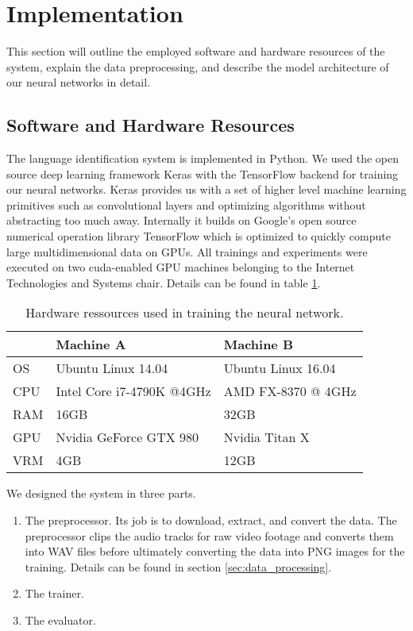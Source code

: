 \section{Implementation}
This section will outline the employed software and hardware resources of the system, explain the data preprocessing, and describe the model architecture of our neural networks in detail.

\subsection{Software and Hardware Resources}

	The language identification system is implemented in Python. We used the open source deep learning framework Keras\cite{chollet2015keras} with the TensorFlow\cite{abadi2016tensorflow} backend for training our neural networks. Keras provides us with a set of higher level machine learning primitives such as convolutional layers and optimizing algorithms without abstracting too much away. Internally it builds on Google's open source numerical operation library TensorFlow which is optimized to quickly compute large multidimensional data on GPUs.
		All trainings and experiments were executed on two cuda-enabled GPU machines belonging to the Internet Technologies and Systems chair. Details can be found in table \ref{tab:hardware}.
		
	\begin{table}[h]
	\centering
	\begin{tabularx}{\textwidth}{lll}
	\toprule
	  		& Machine A 					& Machine B \\ \midrule
	OS  	& Ubuntu Linux 14.04 		& Ubuntu Linux 16.04 \\
	CPU  	& Intel\textsuperscript{\textregistered} Core\textsuperscript{\texttrademark} i7-4790K @4GHz 	& AMD FX\textsuperscript{\texttrademark}-8370  @ 4GHz \\
	RAM  	& 16GB 						& 32GB \\
	GPU  	& Nvidia GeForc\textsuperscript{\textregistered}e GTX 980 	& Nvidia Titan X \\
	VRM  	& 4GB 						& 12GB \\
	\bottomrule
	\end{tabularx}
	\caption{Hardware ressources used in training the neural network.}
	\label{tab:hardware}
	\end{table}
	 
	We designed the system in three parts. 
	\begin{enumerate}
		\item The preprocessor. Its job is to download, extract, and convert the data. The preprocessor clips the audio tracks for raw video footage and converts them into WAV files before ultimately converting the data into PNG images for the training. Details can be found in section \ref{sec:data_processing}.
		\item The trainer. 
		\item The evaluator.
	\end{enumerate}

